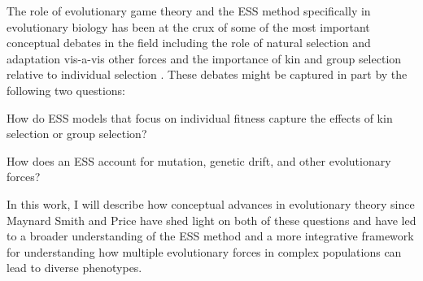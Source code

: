 \documentclass[11pt]{article}
\begin{document}
The role of evolutionary game theory and the ESS method specifically in evolutionary biology has been at the crux of some of the most important conceptual debates in the field including the role of natural selection and adaptation vis-a-vis other forces \cite[e.g.,][]{MaynardSmith:1978,Gould:Lewontin:1979,Lewontin:1979,Orzack:Sober:1994,Gardner:2017,Kern:Hahn:2018,Jensen:Payseur:2019} and the importance of kin and group selection relative to individual selection
\cite[e.g.,][]{Maynard-Smith:1964,Hamilton:1963,Price:1972:cov,Wilson:Wilson:2007,Leigh:2010,Akcay:Van-Cleve:2012,West:Griffin:2007,Gardner:Grafen:2009,Nowak:Tarnita:2010,Abbot:Abe:2011,Allen:Nowak:2013,Birch:2014,Birch:2017,Nowak:McAvoy:2017}. These debates might be captured in part by the following two questions: \begin{ilnum} \item \label{q:I} How do ESS models that focus on individual fitness capture the effects of kin selection or group selection? \item \label{q:II} How does an ESS account for mutation, genetic drift, and other evolutionary forces? \end{ilnum} In this work, I will describe how conceptual advances in evolutionary theory since Maynard Smith and Price \cite{Maynard-Smith:Price:1973} have shed light on both of these questions and have led to a broader understanding of the ESS method and a more integrative framework for understanding how multiple evolutionary forces in complex populations can lead to diverse phenotypes.
\end{document}
